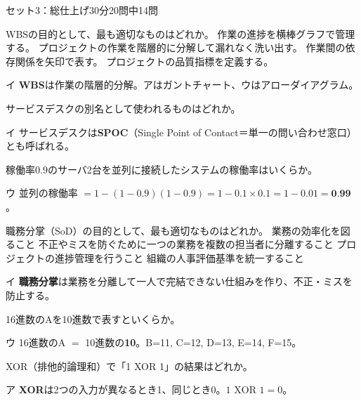 \begin{mogishi}{セット3：総仕上げ}{30分}{20問中14問}
\begin{itpmon}[\diffbadge{標}]{WBSの目的として、最も適切なものはどれか。}
\sentakushi
  {作業の進捗を横棒グラフで管理する。}
  {プロジェクトの作業を階層的に分解して漏れなく洗い出す。}
  {作業間の依存関係を矢印で表す。}
  {プロジェクトの品質指標を定義する。}
\end{itpmon}
\begin{kaisetsu}{イ}
\textbf{WBS}は作業の階層的分解。アはガントチャート、ウはアローダイアグラム。
\end{kaisetsu}

\begin{itpmon}[\diffbadge{標}]{サービスデスクの別名として使われるものはどれか。}
\end{itpmon}
\begin{kaisetsu}{イ}
サービスデスクは\textbf{SPOC}（Single Point of Contact＝単一の問い合わせ窓口）とも呼ばれる。
\end{kaisetsu}

\begin{itpmon}[\diffbadge{強}]{稼働率0.9のサーバ2台を並列に接続したシステムの稼働率はいくらか。}
\end{itpmon}
\begin{kaisetsu}{ウ}
並列の稼働率 $= 1 - (1-0.9)(1-0.9) = 1 - 0.1 \times 0.1 = 1 - 0.01 = \textbf{0.99}$。
\end{kaisetsu}

\begin{itpmon}[\diffbadge{標}]{職務分掌（SoD）の目的として、最も適切なものはどれか。}
\sentakushi
  {業務の効率化を図ること}
  {不正やミスを防ぐために一つの業務を複数の担当者に分離すること}
  {プロジェクトの進捗管理を行うこと}
  {組織の人事評価基準を統一すること}
\end{itpmon}
\begin{kaisetsu}{イ}
\textbf{職務分掌}は業務を分離して一人で完結できない仕組みを作り、不正・ミスを防止する。
\end{kaisetsu}

\begin{itpmon}[\diffbadge{標}]{16進数のAを10進数で表すといくらか。}
\end{itpmon}
\begin{kaisetsu}{ウ}
16進数のA $=$ 10進数の\textbf{10}。B=11, C=12, D=13, E=14, F=15。
\end{kaisetsu}

\begin{itpmon}[\diffbadge{標}]{XOR（排他的論理和）で「1 XOR 1」の結果はどれか。}
\end{itpmon}
\begin{kaisetsu}{ア}
\textbf{XOR}は2つの入力が異なるとき1、同じとき0。$1 \text{ XOR } 1 = 0$。
\end{kaisetsu}


\end{mogishi}
